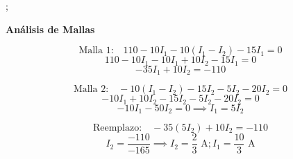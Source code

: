 \documentclass[answers]{exam} %
\begin{document}
\begin{questions}
\begin{center}
\begin{circuitikz}
			;
		\end{circuitikz}
	\end{center}



	\textbf{Análisis de Mallas}

	\[
		\text{Malla 1:} \quad 110 - 10 I_1 - 10 (I_1 - I_2) - 15 I_1 = 0
	\]
	\[
		110 - 10 I_1 - 10 I_1 + 10 I_2 - 15 I_1 = 0
	\]
	\[
		- 35 I_1 + 10 I_2 = - 110
	\]

	\[
		\text{Malla 2:} \quad -10 (I_1 - I_2) - 15 I_2 - 5 I_2 - 20 I_2 = 0
	\]
	\[
		-10 I_1 + 10 I_2 - 15 I_2 - 5 I_2 - 20 I_2 = 0
	\]
	\[
		-10 I_1 - 50 I_2 = 0 \implies I_1 = 5 I_2
	\]

	\[
		\text{Reemplazo:} \quad - 35 ( 5 I_2 )+ 10 I_2 = - 110
	\]
	\[
		I_2 = \dfrac{-110}{-165} \implies \boxed{I_2 = \dfrac{2}{3} \text{ A} ; I_1 = \dfrac{10}{3} \text{ A}}
	\]

	\newpage
\end{questions}
\end{document}
